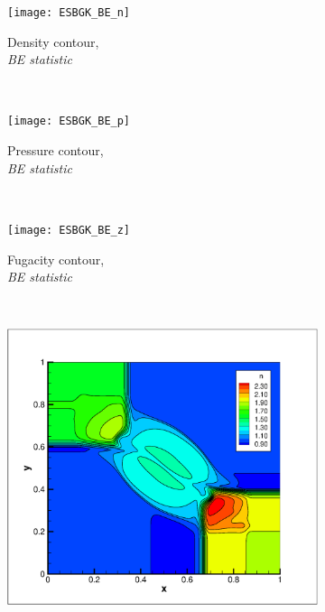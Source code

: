 \documentclass{rsproca}%
\begin{document}
\begin{figure}
        \centering
        \begin{subfigure}[b]{0.32\textwidth}
                \centering
                \texttt{[image: ESBGK\_BE\_n]}
                \caption{Density contour, \\ \it{BE statistic}}
                \label{fig:5ESBGK_BE_n}
        \end{subfigure}%
        ~ %
				\begin{subfigure}[b]{0.32\textwidth}
                \centering
                \texttt{[image: ESBGK\_BE\_p]}
                \caption{Pressure contour, \\ \it{BE statistic}}
                \label{fig:5ESBGK_BE_p}
        \end{subfigure}
        ~ %
        \begin{subfigure}[b]{0.32\textwidth}
                \centering
                \texttt{[image: ESBGK\_BE\_z]}
                \caption{Fugacity contour, \\ \it{BE statistic}}
                \label{fig:5ESBGK_BE_z}
        \end{subfigure}
				~ %
        \begin{subfigure}[b]{0.32\textwidth}
                \centering
                \includegraphics[trim = 20mm 15mm 20mm 20mm,clip,width=\textwidth]{ESBGK_MB_n}

\end{subfigure}
\end{figure}
\end{document}
